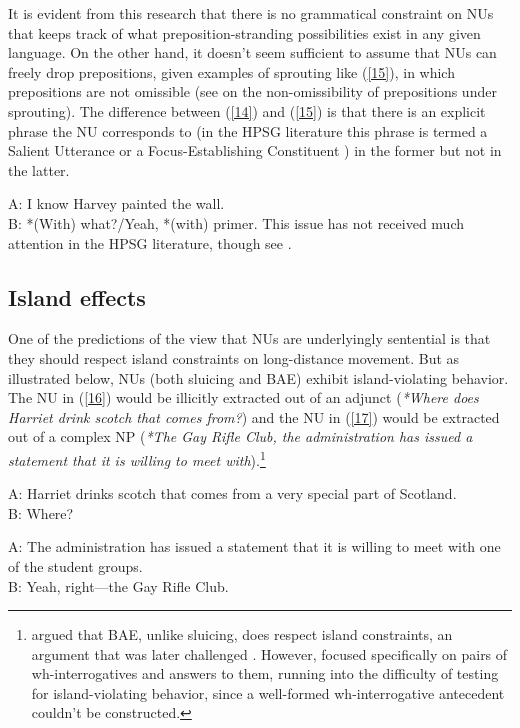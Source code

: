 \documentclass[output=paper
                ,modfonts
                ,nonflat
	        ,collection
	        ,collectionchapter
	        ,collectiontoclongg
 	        ,biblatex
                ,babelshorthands
                ,newtxmath
                ,draftmode
                ,colorlinks, citecolor=brown
]{./langsci/langscibook}
\begin{document}
{It is evident from this research that there is no grammatical constraint on NUs that keeps track of what preposition-stranding possibilities exist in any given language. On the other hand, it doesn't seem sufficient to assume that NUs can freely drop prepositions, given examples of sprouting like (\ref{15}), in which prepositions are not omissible (see \citealt{Chung1995} on the non-omissibility of prepositions under sprouting). The difference between (\ref{14}) and (\ref{15}) is that there is an explicit phrase the NU corresponds to (in the HPSG literature this phrase is termed a Salient Utterance \citep[313]{Ginzburg:Sag:2000} or a Focus-Establishing Constituent \citealt{Ginzburg2012}) in the former but not in the latter.

\ea A: I know Harvey painted the wall.\\B: *(With) what?/Yeah, *(with) primer.\label{15}\z
This issue has not received much attention in the HPSG literature, though see \citet{Kim2015}.


\subsection{Island effects}
One of the predictions of the view that NUs are underlyingly sentential is that they should respect island constraints on long-distance movement. But as illustrated below, NUs (both sluicing and BAE) exhibit island-violating behavior. The NU in (\ref{16}) would be illicitly extracted out of an adjunct (\textit{*Where does Harriet drink scotch that comes from?}) and the NU in (\ref{17}) would be extracted out of a complex NP (\textit{*The Gay Rifle Club, the administration has issued a statement that it is willing to meet with}).\footnote{\citet{Merchant2005a} argued that BAE, unlike sluicing, does respect island constraints, an argument that was later challenged \citep[see e.g,][]{CJ2005a, Griffiths2014}. However, \citet{Merchant2005-proc} focused specifically on pairs of wh-interrogatives and answers to them, running into the difficulty of testing for island-violating behavior, since a well-formed wh-interrogative antecedent couldn't be constructed.}

\ea A: Harriet drinks scotch that comes from a very special part of Scotland.\\B: Where? \citep[245]{CJ2005a} \label{16}\z

\ea A: The administration has issued a statement that it is willing to meet with one of the student groups.\\B: Yeah, right---the Gay Rifle Club. \citep[245]{CJ2005a} \label{17}\z

}
\end{document}
